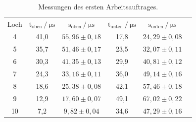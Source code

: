 \begin{table}[H]
    \centering
    \caption{Messungen des ersten Arbeitsauftrages.} 
    \label{Tabelle5}
    \begin{tabular} {c  c  c  c  c  c}
        \toprule
        {$ \text{Loch} $} &
        {$ \text{t}_{\text{oben}}  \mathbin{/} \unit{\micro\second} $} &
        {$ \text{s}_{\text{oben}}  \mathbin{/} \unit{\micro\second} $} &
        {$ \text{t}_{\text{unten}} \mathbin{/} \unit{\micro\second} $} &
        {$ \text{s}_{\text{unten}} \mathbin{/} \unit{\micro\second} $} \\
        \midrule
        4  & 41,0 & $ 55,96 \pm 0,18 $ & 17,8 & $ 24,29 \pm 0,08 $ \\
        5  & 35,7 & $ 51,46 \pm 0,17 $ & 23,5 & $ 32,07 \pm 0,11 $ \\
        6  & 30,3 & $ 41,35 \pm 0,13 $ & 29,9 & $ 40,81 \pm 0,12 $ \\
        7  & 24,3 & $ 33,16 \pm 0,11 $ & 36,0 & $ 49,14 \pm 0,16 $ \\
        8  & 18,6 & $ 25,38 \pm 0,08 $ & 42,1 & $ 57,46 \pm 0,18 $ \\
        9  & 12,9 & $ 17,60 \pm 0,07 $ & 49,1 & $ 67,02 \pm 0,22 $ \\
        10 & 7,2  & $ 9,82  \pm 0,04 $ & 34,6 & $ 47,29 \pm 0,16 $ \\
        \bottomrule
    \end{tabular} 
\end{table}